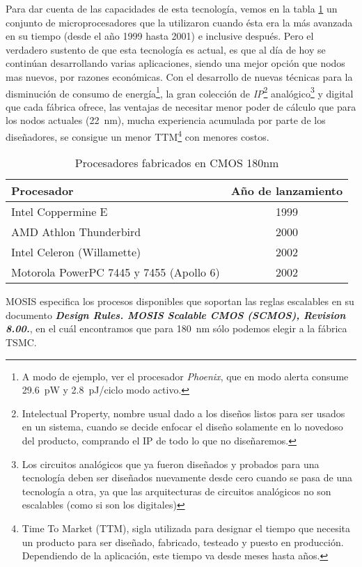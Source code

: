 Para dar cuenta de las capacidades de esta tecnología, vemos en la tabla \ref{tab:procesadores180nm} un conjunto de microprocesadores que la utilizaron cuando ésta era la más avanzada en su tiempo (desde el año 1999 hasta 2001) e inclusive después. Pero el verdadero sustento de que esta tecnología es actual, es que al día de hoy se continúan desarrollando varias aplicaciones, siendo una mejor opción que nodos mas nuevos, por razones económicas. Con el desarrollo de nuevas técnicas para la disminución de consumo de energía\footnote{A modo de ejemplo, ver el procesador \emph{Phoenix}, que en modo alerta consume 29.6~pW y 2.8~pJ/ciclo modo activo\cite{phoenixP}.}, la gran colección de \emph{IP}\footnote{Intelectual Property, nombre usual dado a los diseños listos para ser usados en un sistema, cuando se decide enfocar el diseño solamente en lo novedoso del producto, comprando el IP de todo lo que no diseñaremos.} analógico\footnote{Los circuitos analógicos que ya fueron diseñados y probados para una tecnología deben ser diseñados nuevamente desde cero cuando se pasa de una tecnología a otra, ya que las arquitecturas de circuitos analógicos no son escalables (como si son los digitales)} y digital que cada fábrica ofrece, las ventajas de necesitar menor poder de cálculo que para los nodos actuales (22~nm), mucha experiencia acumulada por parte de los diseñadores, se consigue un menor TTM\footnote{Time To Market (TTM), sigla utilizada para designar el tiempo que necesita un producto para ser diseñado, fabricado, testeado y puesto en producción. Dependiendo de la aplicación, este tiempo va desde meses hasta años.} con menores costos.


\begin{table}[h]
\centering
\begin{tabular}{@{}lc@{}}
\toprule
Procesador             & Año de lanzamiento \\ \midrule
Intel Coppermine E                & 1999             \\
AMD Athlon Thunderbird      & 2000             \\
Intel Celeron (Willamette)               & 2002            \\
Motorola PowerPC 7445 y 7455 (Apollo 6) & 2002           \\ \bottomrule
\end{tabular}
\caption{Procesadores fabricados en CMOS 180nm }
\label{tab:procesadores180nm}
\end{table}

MOSIS especifica los procesos disponibles que soportan las reglas escalables en su documento \emph{\textbf{Design Rules. MOSIS Scalable CMOS (SCMOS), Revision 8.00.}}, en el cuál encontramos que para 180~nm sólo podemos elegir a la fábrica TSMC.

